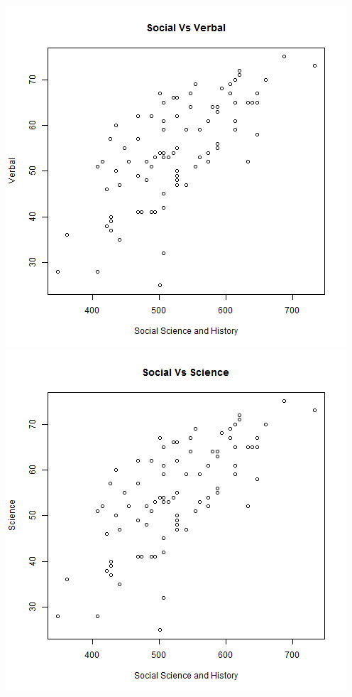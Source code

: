 \documentclass[letterpaper,10pt]{article}
\begin{document}
\begin{description}
\begin{enumerate}
\begin{center}
\includegraphics[scale=.33]{SocialvHistory.png}
\includegraphics[scale=.33]{SocialvScience.png}

\end{center}
\end{enumerate}
\end{description}
\end{document}
